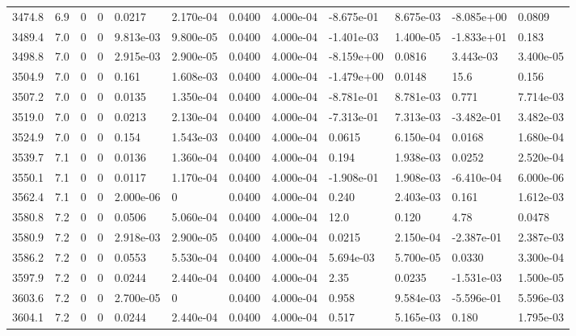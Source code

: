 \documentclass[preview]{standalone}
\begin{document}
{{{{{{{{{\begin{tabular}{L{1.2cm}C{1.2cm} C{0.3cm}C{0.5cm} C{1.4cm}C{1.4cm} C{1.4cm}C{1.4cm} C{1.6cm}C{1.6cm} C{1.6cm}C{1.6cm}}
  3474.8  &   6.9  & 0     &  0 &  0.0217  & 2.170e-04  &  0.0400&   4.000e-04& -8.675e-01 & 8.675e-03   &  -8.085e+00 & 0.0809  \\ 
  3489.4  &   7.0  & 0     &  0 &  9.813e-03  & 9.800e-05  &  0.0400&   4.000e-04& -1.401e-03 & 1.400e-05   &  -1.833e+01 & 0.183  \\ 
  3498.8  &   7.0  & 0     &  0 &  2.915e-03  & 2.900e-05  &  0.0400&   4.000e-04& -8.159e+00 & 0.0816   &  3.443e-03 & 3.400e-05  \\ 
  3504.9  &   7.0  & 0     &  0 &  0.161  & 1.608e-03  &  0.0400&   4.000e-04& -1.479e+00 & 0.0148   &  15.6 & 0.156  \\ 
  3507.2  &   7.0  & 0     &  0 &  0.0135  & 1.350e-04  &  0.0400&   4.000e-04& -8.781e-01 & 8.781e-03   &  0.771 & 7.714e-03  \\ 
  3519.0  &   7.0  & 0     &  0 &  0.0213  & 2.130e-04  &  0.0400&   4.000e-04& -7.313e-01 & 7.313e-03   &  -3.482e-01 & 3.482e-03  \\ 
  3524.9  &   7.0  & 0     &  0 &  0.154  & 1.543e-03  &  0.0400&   4.000e-04& 0.0615 & 6.150e-04   &  0.0168 & 1.680e-04  \\ 
  3539.7  &   7.1  & 0     &  0 &  0.0136  & 1.360e-04  &  0.0400&   4.000e-04& 0.194 & 1.938e-03   &  0.0252 & 2.520e-04  \\ 
  3550.1  &   7.1  & 0     &  0 &  0.0117  & 1.170e-04  &  0.0400&   4.000e-04& -1.908e-01 & 1.908e-03   &  -6.410e-04 & 6.000e-06  \\ 
  3562.4  &   7.1  & 0     &  0 &  2.000e-06  & 0  &  0.0400&   4.000e-04& 0.240 & 2.403e-03   &  0.161 & 1.612e-03  \\ 
  3580.8  &   7.2  & 0     &  0 &  0.0506  & 5.060e-04  &  0.0400&   4.000e-04& 12.0 & 0.120   &  4.78 & 0.0478  \\ 
  3580.9  &   7.2  & 0     &  0 &  2.918e-03  & 2.900e-05  &  0.0400&   4.000e-04& 0.0215 & 2.150e-04   &  -2.387e-01 & 2.387e-03  \\ 
  3586.2  &   7.2  & 0     &  0 &  0.0553  & 5.530e-04  &  0.0400&   4.000e-04& 5.694e-03 & 5.700e-05   &  0.0330 & 3.300e-04  \\ 
  3597.9  &   7.2  & 0     &  0 &  0.0244  & 2.440e-04  &  0.0400&   4.000e-04& 2.35 & 0.0235   &  -1.531e-03 & 1.500e-05  \\ 
  3603.6  &   7.2  & 0     &  0 &  2.700e-05  & 0  &  0.0400&   4.000e-04& 0.958 & 9.584e-03   &  -5.596e-01 & 5.596e-03  \\ 
  3604.1  &   7.2  & 0     &  0 &  0.0244  & 2.440e-04  &  0.0400&   4.000e-04& 0.517 & 5.165e-03   &  0.180 & 1.795e-03  \\ 

\end{tabular}}}}}}}}}}
\end{document}
